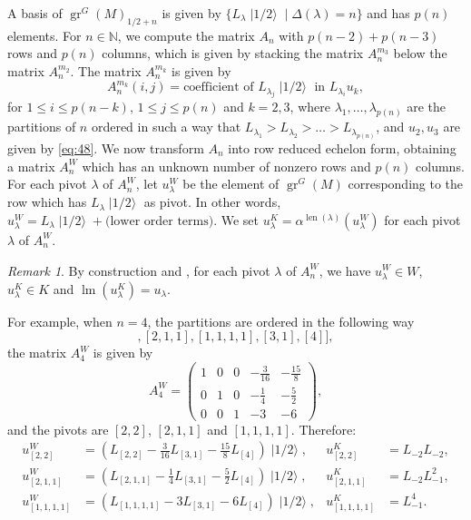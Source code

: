 \documentclass[a4paper, 12pt, reqno]{amsart}
\theoremstyle{remark}
\newtheorem{remark}[theorem]{Remark}
\DeclareMathOperator{\gr}{gr}
\DeclareMathOperator{\lm}{lm}
\DeclareMathOperator{\len}{len}
\DeclareMathOperator{\vachalf}{|1/2\rangle}
\begin{document}
A basis of $\gr^G(M)_{1/2 + n}$ is given by $\{L_{\lambda}\vachalf \mid \Delta(\lambda) = n\}$ and has $p(n)$ elements.
For $n \in \mathbb{N}$, we compute the matrix $A_n$ with $p(n - 2) + p(n - 3)$ rows and $p(n)$ columns, which is given by stacking the matrix $A^{m_3}_n$ below the matrix $A^{m_2}_n$.
The matrix $A^{m_k}_n$ is given by
\begin{equation*}
  A^{m_k}_n(i, j) = \text{coefficient of $L_{\lambda_j}\vachalf$ in $L_{\lambda_i}u_k$},
\end{equation*}
for $1 \le i \le p(n - k)$, $1 \le j \le p(n)$ and $k = 2, 3$, where $\lambda_1, \dots, \lambda_{p(n)}$ are the partitions of $n$ ordered in such a way that $L_{\lambda_1} > L_{\lambda_2} > \dots > L_{\lambda_{p(n)}}$, and $u_2, u_3$ are given by \eqref{eq:48}.
We now transform $A_n$ into row reduced echelon form, obtaining a matrix $A^W_n$ which has an unknown number of nonzero rows and $p(n)$ columns.
For each pivot $\lambda$ of $A^W_n$, let $u^W_{\lambda}$ be the element of $\gr^G(M)$ corresponding to the row which has $L_{\lambda}\vachalf$ as pivot.
In other words, $u^W_{\lambda} = L_{\lambda}\vachalf + \text{(lower order terms)}$.
We set $u^K_{\lambda} = \alpha^{\len(\lambda)}(u^W_{\lambda})$ for each pivot $\lambda$ of $A^W_n$.

\begin{remark}
  \label{rmk:50}
  By construction and , for each pivot $\lambda$ of $A^W_n$, we have $u^W_{\lambda} \in W$, $u^K_{\lambda} \in K$ and $\lm(u^K_{\lambda}) = u_{\lambda}$.
\end{remark}

For example, when $n = 4$, the partitions are ordered in the following way
\begin{equation*}
  [[2, 2], [2, 1, 1], [1, 1, 1, 1], [3, 1], [4]],
\end{equation*}
the matrix $A^W_4$ is given by
\begin{equation*}
  A^W_4=
  \begin{pmatrix}
    1 & 0 & 0 & -\frac{3}{16} & -\frac{15}{8} \\
    0 & 1 & 0 & -\frac{1}{4} & -\frac{5}{2} \\
    0 & 0 & 1 & -3 & -6
  \end{pmatrix},
\end{equation*}
and the pivots are $[2, 2]$, $[2, 1, 1]$ and $[1, 1, 1, 1]$.
Therefore:
\begin{align*}
  u^W_{[2, 2]} &= (L_{[2, 2]} - \tfrac{3}{16}L_{[3, 1]} - \tfrac{15}{8}L_{[4]})\vachalf, &u^K_{[2, 2]} &= L_{-2}L_{-2}, \\
  u^W_{[2, 1, 1]} &= (L_{[2, 1, 1]} - \tfrac{1}{4}L_{[3, 1]} - \tfrac{5}{2}L_{[4]})\vachalf, &u^K_{[2, 1, 1]} &= L_{-2}L_{-1}^2, \\
  u^W_{[1, 1, 1, 1]} &= (L_{[1, 1, 1, 1]} - 3L_{[3, 1]} - 6L_{[4]})\vachalf, &u^K_{[1, 1, 1, 1]} &= L_{-1}^4.
\end{align*}
\end{document}
